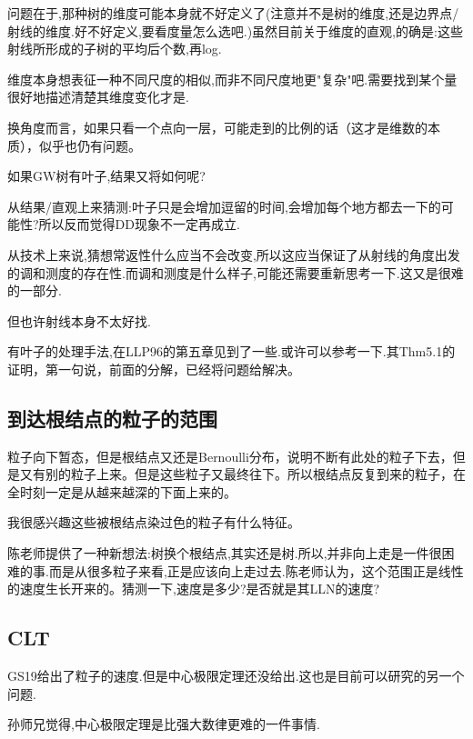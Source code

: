 \documentclass[a4paper,oneside]{ctexbook}
\begin{document}
							问题在于,那种树的维度可能本身就不好定义了(注意并不是树的维度,还是边界点/射线的维度.好不好定义,要看度量怎么选吧.)虽然目前关于维度的直观,的确是:这些射线所形成的子树的平均后个数,再log.

							维度本身想表征一种不同尺度的相似,而非不同尺度地更"复杂"吧.需要找到某个量很好地描述清楚其维度变化才是.

						换角度而言，如果只看一个点向一层，可能走到的比例的话（这才是维数的本质），似乎也仍有问题。

					\begin{que}

						如果GW树有叶子,结果又将如何呢?
					
					\end{que}

						从结果/直观上来猜测:叶子只是会增加逗留的时间,会增加每个地方都去一下的可能性?所以反而觉得DD现象不一定再成立.

						从技术上来说,猜想常返性什么应当不会改变,所以这应当保证了从射线的角度出发的调和测度的存在性.而调和测度是什么样子,可能还需要重新思考一下.这又是很难的一部分.

						但也许射线本身不太好找.

						有叶子的处理手法,在LLP96的第五章见到了一些.或许可以参考一下.其Thm5.1的证明，第一句说，前面的分解，已经将问题给解决。


	\subsection{到达根结点的粒子的范围}
		
		粒子向下暂态，但是根结点又还是Bernoulli分布，说明不断有此处的粒子下去，但是又有别的粒子上来。但是这些粒子又最终往下。所以根结点反复到来的粒子，在全时刻一定是从越来越深的下面上来的。

		我很感兴趣这些被根结点染过色的粒子有什么特征。

		陈老师提供了一种新想法:树换个根结点,其实还是树.所以,并非向上走是一件很困难的事.而是从很多粒子来看,正是应该向上走过去.陈老师认为，这个范围正是线性的速度生长开来的。猜测一下,速度是多少?是否就是其LLN的速度?

	\subsection{CLT}

		GS19\cite{GS19}给出了粒子的速度.但是中心极限定理还没给出.这也是目前可以研究的另一个问题.

		孙师兄觉得,中心极限定理是比强大数律更难的一件事情.
\end{document}
